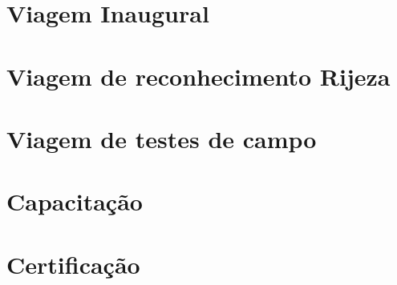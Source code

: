 \documentclass[a4paper,11pt,oneside,brazilian,
draft=false]{report}%
\newcommand*{\standardchapterstyle}{%
  \titleformat{\chapter}[display]
  {\normalfont\huge\bfseries}{\chaptertitlename\ \thechapter}{20pt}{\Huge}
  \titlespacing*{\chapter}{0pt}{50pt}{40pt}
}
\begin{document}
\chapter{Viagem Inaugural}



\chapter{Viagem de reconhecimento Rijeza}



\chapter{Viagem de testes de campo}




\chapter{Capacitação}


\chapter{Certificação}







 
 
%
%
%
%
%
%





%

\standardchapterstyle   
\end{document}

